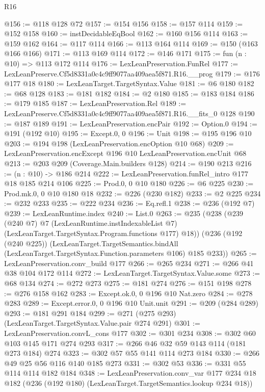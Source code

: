 \begin{lexlean}{R16}
\begin{coremodule}
@156 := @118 @128 @72
@157 := @154 @156
@158 := @157 @114
@159 := @152 @158
@160 := instDecidableEqBool
@162 := @160 @156 @114
@163 := @159 @162
@164 := @117 @114
@166 := @113 @164 @114
@169 := @150 (@163 @166 @166)
@171 := @113 @169 @114
@172 := @146 @171
@175 := fun (n : @10) => @113 @172 @114
@176 := LexLeanPreservation.FunRel
@177 := LexLeanPreserve.Cf5d8331a0c4c9ff9077aa409aea5f871.R16.__prog
@179 := @176 @177 @18
@180 := LexLeanTarget.TargetSyntax.Value
@181 := @6 @180
@182 := @68 @128
@183 := @181 @182
@184 := @2 @180
@185 := @183 @184
@186 := @179 @185
@187 := LexLeanPreservation.Rel
@189 := LexLeanPreserve.Cf5d8331a0c4c9ff9077aa409aea5f871.R16.__fits_0 @128
@190 := @187 @189
@191 := LexLeanPreservation.encPair
@192 := Option.{0}
@194 := @191 (@192 @10)
@195 := Except.{0, 0}
@196 := Unit
@198 := @195 @196 @10
@203 := @194 @198 (LexLeanPreservation.encOption @10 @68)
@209 := LexLeanPreservation.encExcept @196 @10 LexLeanPreservation.encUnit @68
@213 := @203 @209 (Coverage.Main.builders @128)
@214 := @190 @213
@216 := (n : @10) -> @186 @214
@222 := LexLeanPreservation.funRel_intro @177 @18 @185 @214 @106
@225 := Prod.{0, 0} @10 @180
@226 := @6 @225
@230 := Prod.mk.{0, 0} @10 @180 @18
@232 := @226 (@230 @182)
@233 := @2 @225
@234 := @232 @233
@235 := @222 @234
@236 := Eq.refl.{1}
@238 := @236 (@192 @7)
@239 := LexLeanRuntime.index
@240 := List.{0}
@263 := @235
    (@238
      (@239
        (@240 @7)
        @7
        (LexLeanRuntime.instIndexableList @7)
        (LexLeanTarget.TargetSyntax.Program.functions @177)
        @18))
    (@236
      (@192 (@240 @225))
      (LexLeanTarget.TargetSemantics.bindAll
        (LexLeanTarget.TargetSyntax.Function.parameters @106)
        @185
        @233))
@265 := LexLeanPreservation.conv_build @177
@266 := @265 @234
@271 := @266 @41 @38 @104 @172 @114
@272 := LexLeanTarget.TargetSyntax.Value.some
@273 := @68 @134
@274 := @272 @273
@275 := @181 @274
@276 := @151 @198
@278 := @276 @158 @162
@283 := Except.ok.{0, 0} @196 @10 Nat.zero
@284 := @278 @283
@289 := Except.error.{0, 0} @196 @10 Unit.unit
@291 := @209 (@284 @289)
@293 := @181 @291 @184
@299 := @271 (@275 @293) (LexLeanTarget.TargetSyntax.Value.pair @274 @291)
@301 := LexLeanPreservation.convL_cons @177
@302 := @301 @234
@308 := @302 @60 @103 @145 @171 @274 @293
@317 := @266 @46 @32 @59 @143 @114 (@181 @273 @184) @274
@323 := @302 @57 @55 @141 @114 @273 @184
@330 := @266 @49 @25 @56 @116 @140 @185 @273
@331 := @302 @53
@336 := @331 @55 @114 @114 @182 @184
@348 := LexLeanPreservation.conv_var
    @177
    @234
    @18
    @182
    (@236 (@192 @180) (LexLeanTarget.TargetSemantics.lookup @234 @18))

\end{coremodule}
\end{lexlean}
